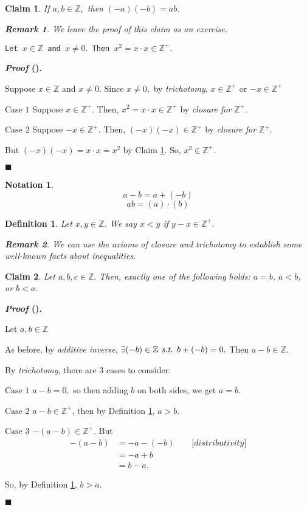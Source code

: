 \documentclass[12pt,a4paper]{article}
\newtheorem{nota}{Notation}[section]
\newtheorem{df}{Definition}[subsection]
\newtheorem{clm}{Claim}[subsection]
\newcounter{nprf}[subsection]
\newtheorem*{rmk}{\indent Remark}
\newenvironment*{prf}{\par\indent\textbf{\textit{Proof} (\stepcounter{nprf}\thenprf). }\par}{\par\hfill $\blacksquare$\par}
\def\Z{{\mathbb{Z}}}
\def\Zp{{\Z^{+}}}
\def\st{\emph{ s.t. }}
\begin{document}
\begin{clm}\label{clm3.1.4}
	If $a,b\in\Z,$ then $(-a)(-b)=ab.$	
	\begin{rmk} We leave the proof of this claim as an exercise. \end{rmk}
\end{clm}
\begin{framed}
\noindent\texttt{Let $x\in\Z$ and $x\neq0.$ Then $x^2=x\cdot x\in\Zp.$} \label{Problem1}
\begin{prf}
	Suppose $x\in\Z$ and $x\neq0$. Since $x\neq0,$ by \textit{trichotomy}, $x\in\Zp$ or $-x\in\Zp$\par$\boxed{\text{Case }1}$ Suppose $x\in\Zp.$ Then, $x^2=x\cdot x\in\Zp$ by \textit{closure for $\Zp$}.\par$\boxed{\text{Case }2}$ Suppose $-x\in\Zp.$ Then, $(-x)(-x)\in\Zp$ by \textit{closure for $\Zp$}.\par\hspace{5mm}But $(-x)(-x)=x\cdot x=x^2$ by Claim \ref{clm3.1.4}. So, $x^2\in\Zp.$
\end{prf}	
\end{framed}
\begin{nota}
	\[a-b=a+(-b)\]\[ab=(a)\cdot(b)\]
\end{nota}
\begin{df}\label{df3.1.2}
	Let $x,y\in\Z$. We say $x<y$ if $y-x\in\Zp.$
	\begin{rmk} We can use the axioms of closure and trichotomy to establish some well-known facts about inequalities. \end{rmk}
\end{df}
\begin{framed}
\begin{clm}
	Let $a,b,c\in\Z.$ Then, exactly one of the following holds: $a=b$, $a<b$, or $b<a$.
\end{clm}
	\begin{prf}
		Let $a,b\in\Z$\par As before, by \textit{additive inverse}, $\exists(-b)\in\Z\st b+(-b)=0.$ Then $a-b\in\Z.$\par By \textit{trichotomy}, there are 3 cases to consider:\par$\boxed{\text{Case }1}$ $a-b=0,$ so then adding $b$ on both sides, we get $a=b.$\par $\boxed{\text{Case }2}$ $a-b\in\Zp$, then by Definition \ref{df3.1.2}, $a>b$.\par $\boxed{\text{Case }3}$ $-(a-b)\in\Zp.$ But \[\begin{aligned}-(a-b)&=-a-(-b)\qquad\big[\textit{distributivity}\big]\\&=-a+b\\&=b-a.\end{aligned}\]\par\hspace{5mm}So, by Definition \ref{df3.1.2}, $b>a.$
	\end{prf}
\end{framed}
\end{document}
